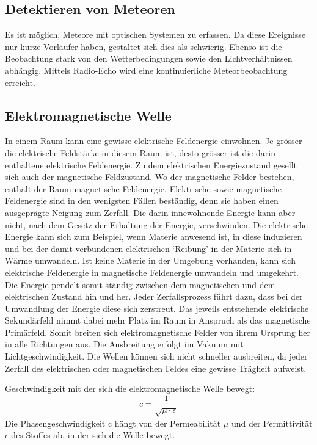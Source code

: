 \begin{refsection}
\newpage
\section{Detektieren von Meteoren}

Es ist möglich, Meteore mit optischen Systemen zu erfassen. 
Da diese Ereignisse nur kurze Vorläufer haben, gestaltet sich dies als schwierig.
Ebenso ist die Beobachtung stark von den Wetterbedingungen sowie den Lichtverhältnissen abhängig.
Mittels Radio-Echo wird eine kontinuierliche Meteorbeobachtung erreicht. 

\subsection{Elektromagnetische Welle}
In einem Raum kann eine gewisse elektrische Feldenergie einwohnen.
Je grösser die elektrische Feldstärke in diesem Raum ist, desto grösser ist die darin enthaltene elektrische Feldenergie.
Zu dem elektrischen Energiezustand gesellt sich auch der magnetische Feldzustand.
Wo der magnetische Felder bestehen, enthält der Raum magnetische Feldenergie.
Elektrische sowie magnetische Feldenergie sind in den wenigsten Fällen beständig, denn sie haben einen ausgeprägte Neigung zum Zerfall.
Die darin innewohnende Energie kann aber nicht, nach dem Gesetz der Erhaltung der Energie, verschwinden.
Die elektrische Energie kann sich zum Beispiel, wenn Materie anwesend ist, in diese induzieren und bei der damit verbundenen elektrischen `Reibung' in der Materie sich in Wärme umwandeln.
Ist keine Materie in der Umgebung vorhanden, kann sich elektrische Feldenergie in magnetische Feldenergie umwandeln und umgekehrt. 
Die Energie pendelt somit ständig zwischen dem magnetischen und dem elektrischen Zustand hin und her.
Jeder Zerfallsprozess führt dazu, dass bei der Umwandlung der Energie diese sich zerstreut.
Das jeweils entstehende elektrische Sekundärfeld nimmt dabei mehr Platz im Raum in Anspruch als das magnetische Primärfeld.
Somit breiten sich elektromagnetische Felder von ihrem Ursprung her in alle Richtungen aus.
Die Ausbreitung erfolgt im Vakuum mit Lichtgeschwindigkeit.
Die Wellen können sich nicht schneller ausbreiten, da jeder Zerfall des elektrischen oder magnetischen Feldes eine gewisse Trägheit aufweist\cite{buch:meinke}.

Geschwindigkeit mit der sich die elektromagnetische Welle bewegt:
\[
c
=
\frac{1}{\sqrt{\mu\cdot\epsilon}}
\]
Die Phasengeschwindigkeit c hängt von der Permeabilität $\mu$ und der Permittivität $\epsilon$ des Stoffes ab, in der sich die Welle bewegt.


\end{refsection}
